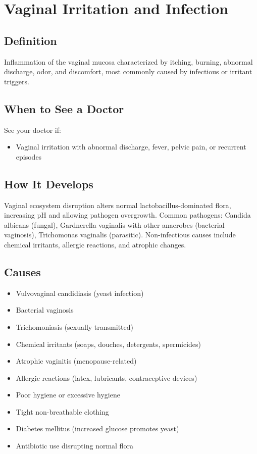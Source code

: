 \chapter{Vaginal Irritation and Infection}

\section*{Definition}
Inflammation of the vaginal mucosa characterized by itching, burning, abnormal discharge, odor, and discomfort, most commonly caused by infectious or irritant triggers.

\section*{When to See a Doctor}
See your doctor if:
\begin{itemize}
  \item Vaginal irritation with abnormal discharge, fever, pelvic pain, or recurrent episodes
\end{itemize}

\section*{How It Develops}
Vaginal ecosystem disruption alters normal lactobacillus-dominated flora, increasing pH and allowing pathogen overgrowth. Common pathogens: Candida albicans (fungal), Gardnerella vaginalis with other anaerobes (bacterial vaginosis), Trichomonas vaginalis (parasitic). Non-infectious causes include chemical irritants, allergic reactions, and atrophic changes.

\section*{Causes}
\begin{itemize}
  \item Vulvovaginal candidiasis (yeast infection)
  \item Bacterial vaginosis
  \item Trichomoniasis (sexually transmitted)
  \item Chemical irritants (soaps, douches, detergents, spermicides)
  \item Atrophic vaginitis (menopause-related)
  \item Allergic reactions (latex, lubricants, contraceptive devices)
  \item Poor hygiene or excessive hygiene
  \item Tight non-breathable clothing
  \item Diabetes mellitus (increased glucose promotes yeast)
  \item Antibiotic use disrupting normal flora
\end{itemize}

